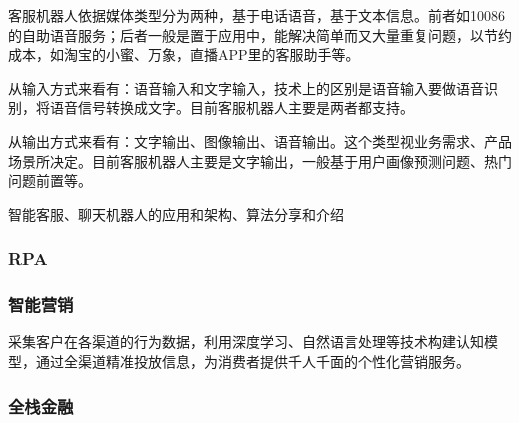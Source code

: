 \documentclass[letterpaper,10pt,english]{sphinxmanual}
\begin{document}
客服机器人依据媒体类型分为两种，基于电话语音，基于文本信息。前者如10086的自助语音服务；后者一般是置于应用中，能解决简单而又大量重复问题，以节约成本，如淘宝的小蜜、万象，直播APP里的客服助手等。

从输入方式来看有：语音输入和文字输入，技术上的区别是语音输入要做语音识别，将语音信号转换成文字。目前客服机器人主要是两者都支持。

从输出方式来看有：文字输出、图像输出、语音输出。这个类型视业务需求、产品场景所决定。目前客服机器人主要是文字输出，一般基于用户画像预测问题、热门问题前置等。%
\begin{footnote}[1122]\sphinxAtStartFootnote
{}
%
\end{footnote}

智能客服、聊天机器人的应用和架构、算法分享和介绍%
\begin{footnote}[1123]\sphinxAtStartFootnote
{}
%
\end{footnote}


\subsubsection{RPA}
\label{\detokenize{chapter_AI+Finance/RPA:rpa}}\label{\detokenize{chapter_AI+Finance/RPA::doc}}


\subsubsection{智能营销}
\label{\detokenize{chapter_AI+Finance/MarTech:id1}}\label{\detokenize{chapter_AI+Finance/MarTech::doc}}
采集客户在各渠道的行为数据，利用深度学习、自然语言处理等技术构建认知模型，通过全渠道精准投放信息，为消费者提供千人千面的个性化营销服务。


\subsubsection{全栈金融}
\label{\detokenize{chapter_AI+Finance/Full_stack:id1}}\label{\detokenize{chapter_AI+Finance/Full_stack::doc}}



\renewcommand{\indexname}{Index}
\printindex
\end{document}
